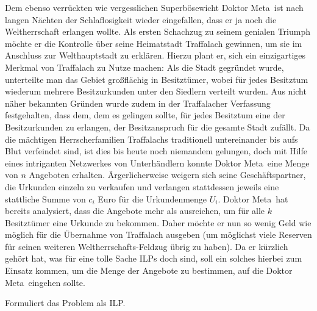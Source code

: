  \newcommand{\Actor}{Doktor Meta\ } Dem ebenso verrückten wie vergesslichen Superbösewicht \Actor ist nach langen Nächten der Schlaflosigkeit wieder eingefallen, dass er ja noch die Weltherrschaft erlangen wollte. 
	Als ersten Schachzug zu seinem genialen Triumph möchte er die Kontrolle über seine Heimatstadt Traffalach gewinnen, um sie im Anschluss zur Welthauptstadt zu erklären. 
	Hierzu plant er, sich ein einzigartiges Merkmal von Traffalach zu Nutze machen:
	Als die Stadt gegründet wurde, unterteilte man das Gebiet großflächig in Besitztümer, wobei für jedes Besitztum wiederum mehrere Besitzurkunden unter den Siedlern verteilt wurden. 
	Aus nicht näher bekannten Gründen wurde zudem in der Traffalacher Verfassung festgehalten, dass dem, dem es gelingen sollte, für jedes Besitztum eine der Besitzurkunden zu erlangen, der Besitzanspruch für die gesamte Stadt zufällt. \newline
	Da die mächtigen Herrscherfamilien Traffalachs traditionell untereinander bis aufs Blut verfeindet sind, ist dies bis heute noch niemandem gelungen, doch mit Hilfe eines intriganten Netzwerkes von Unterhändlern konnte \Actor eine Menge von $n$ Angeboten erhalten. 
	Ärgerlicherweise weigern sich seine Geschäftspartner, die Urkunden einzeln zu verkaufen und verlangen stattdessen jeweils eine stattliche Summe von $c_i$ Euro für die Urkundenmenge $U_i$. 
	\Actor hat bereits analysiert, dass die Angebote mehr als ausreichen, um für alle $k$ Besitztümer eine Urkunde zu bekommen. 
	Daher möchte er nun so wenig Geld wie möglich für die Übernahme von Traffalach ausgeben (um möglichst viele Reserven für seinen weiteren Weltherrschafts-Feldzug übrig zu haben). 
	Da er kürzlich gehört hat, was für eine tolle Sache ILPs doch sind, soll ein solches hierbei zum Einsatz kommen, um die Menge der Angebote zu bestimmen, auf die \Actor eingehen sollte.
	
	Formuliert das Problem als ILP.